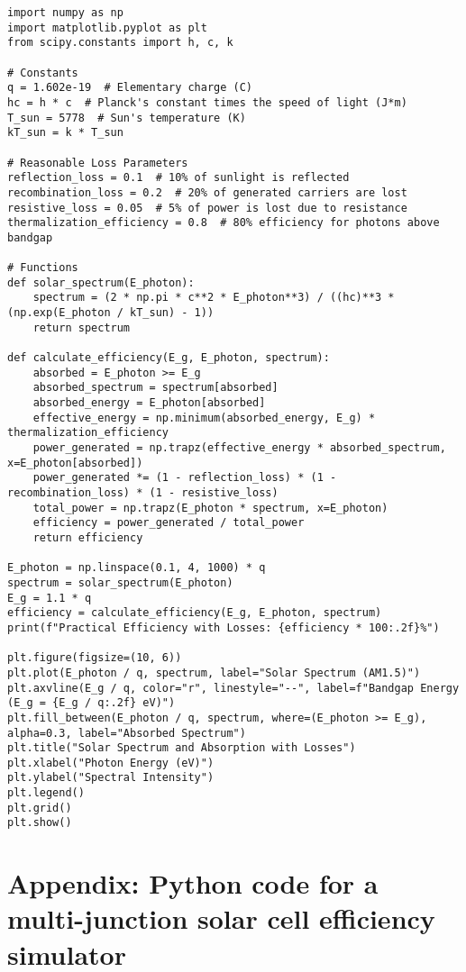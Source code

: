 \documentclass[11pt]{article}
\begin{document}
\begin{lstlisting}[style=custompython, caption=Python Code for Solar Cell Efficiency Simulator]
import numpy as np
import matplotlib.pyplot as plt
from scipy.constants import h, c, k

# Constants
q = 1.602e-19  # Elementary charge (C)
hc = h * c  # Planck's constant times the speed of light (J*m)
T_sun = 5778  # Sun's temperature (K)
kT_sun = k * T_sun

# Reasonable Loss Parameters
reflection_loss = 0.1  # 10% of sunlight is reflected
recombination_loss = 0.2  # 20% of generated carriers are lost
resistive_loss = 0.05  # 5% of power is lost due to resistance
thermalization_efficiency = 0.8  # 80% efficiency for photons above bandgap

# Functions
def solar_spectrum(E_photon):
    spectrum = (2 * np.pi * c**2 * E_photon**3) / ((hc)**3 * (np.exp(E_photon / kT_sun) - 1))
    return spectrum

def calculate_efficiency(E_g, E_photon, spectrum):
    absorbed = E_photon >= E_g
    absorbed_spectrum = spectrum[absorbed]
    absorbed_energy = E_photon[absorbed]
    effective_energy = np.minimum(absorbed_energy, E_g) * thermalization_efficiency
    power_generated = np.trapz(effective_energy * absorbed_spectrum, x=E_photon[absorbed])
    power_generated *= (1 - reflection_loss) * (1 - recombination_loss) * (1 - resistive_loss)
    total_power = np.trapz(E_photon * spectrum, x=E_photon)
    efficiency = power_generated / total_power
    return efficiency

E_photon = np.linspace(0.1, 4, 1000) * q
spectrum = solar_spectrum(E_photon)
E_g = 1.1 * q
efficiency = calculate_efficiency(E_g, E_photon, spectrum)
print(f"Practical Efficiency with Losses: {efficiency * 100:.2f}%")

plt.figure(figsize=(10, 6))
plt.plot(E_photon / q, spectrum, label="Solar Spectrum (AM1.5)")
plt.axvline(E_g / q, color="r", linestyle="--", label=f"Bandgap Energy (E_g = {E_g / q:.2f} eV)")
plt.fill_between(E_photon / q, spectrum, where=(E_photon >= E_g), alpha=0.3, label="Absorbed Spectrum")
plt.title("Solar Spectrum and Absorption with Losses")
plt.xlabel("Photon Energy (eV)")
plt.ylabel("Spectral Intensity")
plt.legend()
plt.grid()
plt.show()
\end{lstlisting}
\newpage
\section{Appendix: Python code for a multi-junction solar cell efficiency simulator}
\end{document}
